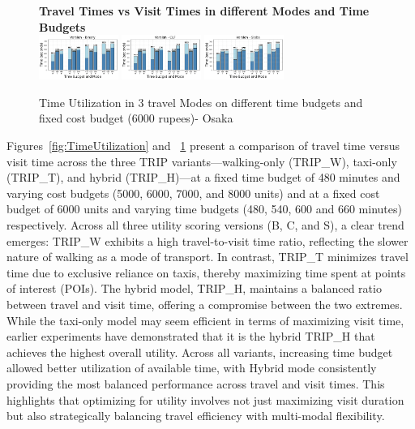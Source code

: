 \begin{figure}[H]
\textbf{Travel Times vs Visit Times in different Modes and Time Budgets}\\
\includegraphics[width=0.23\textwidth]{plots/TIME_UTILIZATION_BINARY1.png}
\includegraphics[width=0.23\textwidth]{plots/TIME_UTILIZATION_CLF1.png}
\includegraphics[width=0.23\textwidth]{plots/TIME_UTILIZATION_SLABS1.png}
\hspace{8pt}
\caption{Time Utilization in 3 travel Modes on different time budgets and fixed cost budget (6000 rupees)- Osaka}
\label{fig:TimeUtilization1}
\end{figure}

Figures~\ref{fig:TimeUtilization} and ~\ref{fig:TimeUtilization1} present a comparison of travel time versus visit time across the three TRIP variants---walking-only (TRIP\_W), taxi-only (TRIP\_T), and hybrid (TRIP\_H)---at a fixed time budget of 480 minutes and varying cost budgets (5000, 6000, 7000, and 8000 units) and at a fixed cost budget of 6000 units and varying time budgets (480, 540, 600 and 660 minutes) respectively. Across all three utility scoring versions (B, C, and S), a clear trend emerges: TRIP\_W exhibits a high travel-to-visit time ratio, reflecting the slower nature of walking as a mode of transport. In contrast, TRIP\_T minimizes travel time due to exclusive reliance on taxis, thereby maximizing time spent at points of interest (POIs). The hybrid model, TRIP\_H, maintains a balanced ratio between travel and visit time, offering a compromise between the two extremes. While the taxi-only model may seem efficient in terms of maximizing visit time, earlier experiments have demonstrated that it is the hybrid TRIP\_H that achieves the highest overall utility. Across all variants, increasing time budget allowed better utilization of available time, with Hybrid mode consistently providing the most balanced performance across travel and visit times. This highlights that optimizing for utility involves not just maximizing visit duration but also strategically balancing travel efficiency with multi-modal flexibility.\\

